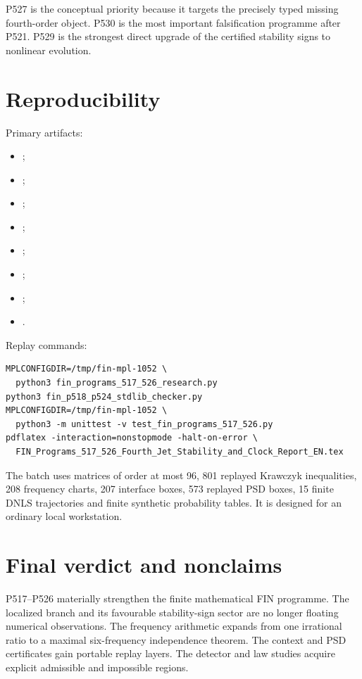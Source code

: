 \documentclass[11pt,a4paper]{article}
\begin{document}
P527 is the conceptual priority because it targets the precisely typed missing fourth-order object. P530 is the most important falsification programme after P521. P529 is the strongest direct upgrade of the certified stability signs to nonlinear evolution.

\section{Reproducibility}

Primary artifacts:
\begin{itemize}
\item {};
\item {};
\item {};
\item {};
\item {};
\item {};
\item {};
\item {}.
\end{itemize}

Replay commands:
\begin{verbatim}
MPLCONFIGDIR=/tmp/fin-mpl-1052 \
  python3 fin_programs_517_526_research.py
python3 fin_p518_p524_stdlib_checker.py
MPLCONFIGDIR=/tmp/fin-mpl-1052 \
  python3 -m unittest -v test_fin_programs_517_526.py
pdflatex -interaction=nonstopmode -halt-on-error \
  FIN_Programs_517_526_Fourth_Jet_Stability_and_Clock_Report_EN.tex
\end{verbatim}

The batch uses matrices of order at most 96, 801 replayed Krawczyk inequalities, 208 frequency charts, 207 interface boxes, 573 replayed PSD boxes, 15 finite DNLS trajectories and finite synthetic probability tables. It is designed for an ordinary local workstation.

\section{Final verdict and nonclaims}

P517--P526 materially strengthen the finite mathematical FIN programme. The localized branch and its favourable stability-sign sector are no longer floating numerical observations. The frequency arithmetic expands from one irrational ratio to a maximal six-frequency independence theorem. The context and PSD certificates gain portable replay layers. The detector and law studies acquire explicit admissible and impossible regions.
\end{document}
